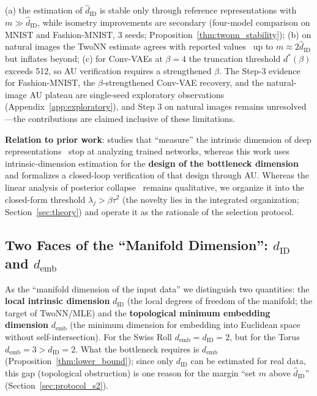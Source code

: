 \documentclass[make,article,submit,pdftex,moreauthors]{Definitions/mdpi}
\newcommand{\dID}{d_{\mathrm{ID}}}
\newcommand{\hatdID}{\hat{d}_{\mathrm{ID}}}
\newcommand{\demb}{d_{\mathrm{emb}}}
\newcommand{\dstar}{d^{*}(\beta)}
\begin{document}
\begin{enumerate}
        (a) the estimation of $\hatdID$ is stable only through reference
        representations with $m \gg \hatdID$, while isometry improvements
        are secondary (four-model comparison on MNIST and Fashion-MNIST,
        3 seeds; Proposition~\ref{thm:twonn_stability});
        (b) on natural images the TwoNN estimate agrees with reported
        values~\cite{pope2021intrinsic} up to $m \approx 2\hatdID$ but
        inflates beyond;
        (c) for Conv-VAEs at $\beta = 4$ the truncation threshold $\dstar$
        exceeds 512, so AU verification requires a strengthened $\beta$.
        The Step-3 evidence for Fashion-MNIST, the $\beta$-strengthened
        Conv-VAE recovery, and the natural-image AU plateau are single-seed
        exploratory observations (Appendix~\ref{app:exploratory}), and
        Step 3 on natural images remains unresolved---the contributions are
        claimed inclusive of these limitations.
\end{enumerate}

\textbf{Relation to prior work}:
studies that ``measure'' the intrinsic dimension of deep
representations~\cite{ansuini2019intrinsic,pope2021intrinsic,valeriani2023geometry}
stop at analyzing trained networks, whereas this work uses
intrinsic-dimension estimation for the \textbf{design of the bottleneck
dimension} and formalizes a closed-loop verification of that design through
AU.
Whereas the linear analysis of posterior collapse~\cite{lucas2019elbo}
remains qualitative, we organize it into the closed-form threshold
$\lambda_j > \beta\tau^2$ (the novelty lies in the integrated organization;
Section~\ref{sec:theory}) and operate it as the rationale of the selection
protocol.

\subsection{Two Faces of the ``Manifold Dimension'': $\dID$ and $\demb$}\label{sec:intro_dim}

As the ``manifold dimension of the input data'' we distinguish two
quantities:
the \textbf{local intrinsic dimension} $\dID$ (the local degrees of freedom
of the manifold; the target of TwoNN/MLE) and the
\textbf{topological minimum embedding dimension} $\demb$ (the minimum
dimension for embedding into Euclidean space without self-intersection).
For the Swiss Roll $\demb = \dID = 2$, but for the Torus
$\demb = 3 > \dID = 2$.
What the bottleneck requires is $\demb$
(Proposition~\ref{thm:lower_bound}); since only $\dID$ can be estimated for
real data, this gap (topological obstruction) is one reason for the margin
``set $m$ above $\hatdID$'' (Section~\ref{sec:protocol_s2}).
\end{document}
